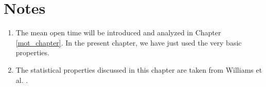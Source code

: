 


\section{Notes}

\begin{enumerate}
\item The mean open time will be introduced and analyzed in Chapter \ref{mot_chapter}. In the present chapter, we have just used the very basic properties.
\item The statistical properties discussed in this chapter are taken from Williams et al. \cite{Williams2008}.
\end{enumerate}





